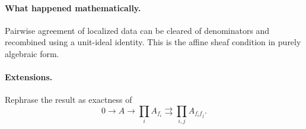 \paragraph{What happened mathematically.}
Pairwise agreement of localized data can be cleared of denominators and recombined using a
unit-ideal identity.  This is the affine sheaf condition in purely algebraic form.

\paragraph{Extensions.}
Rephrase the result as exactness of
\[
0\longrightarrow A\longrightarrow\prod_i A_{f_i}
\rightrightarrows
\prod_{i,j}A_{f_if_j}.
\]
